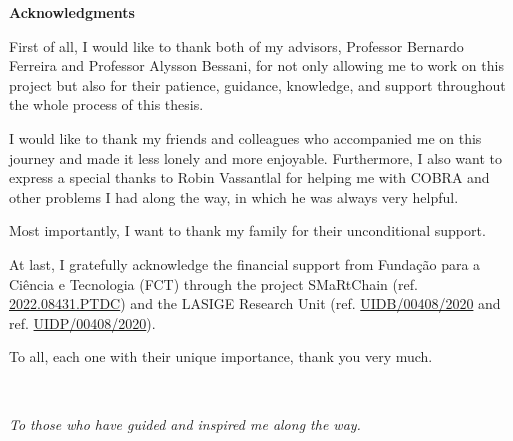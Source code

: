 \pagestyle{plain}

\vspace*{2cm}
\begin{center}
\Large \bf Acknowledgments
\end{center}
\vspace*{1cm} \setlength{\baselineskip}{0.6cm}

First of all, I would like to thank both of my advisors, Professor Bernardo Ferreira and Professor Alysson Bessani, for not only allowing me to work on this project but also for their patience, guidance, knowledge, and support throughout the whole process of this thesis.

I would like to thank my friends and colleagues who accompanied me on this journey and made it less lonely and more enjoyable. Furthermore, I also want to express a special thanks to Robin Vassantlal for helping me with COBRA and other problems I had along the way, in which he was always very helpful. 

Most importantly, I want to thank my family for their unconditional support.

At last, I gratefully acknowledge the financial support from Fundação para a Ciência e Tecnologia (FCT) through the project SMaRtChain (ref. \href{https://doi.org/10.54499/2022.08431.PTDC}{2022.08431.PTDC}) and the LASIGE Research Unit (ref. \href{https://doi.org/10.54499/UIDB/00408/2020}{UIDB/00408/2020} and ref. \href{https://doi.org/10.54499/UIDP/00408/2020}{UIDP/00408/2020}).

To all, each one with their unique importance, thank you very much.

\LIMPA
\LIMPA

~
\vfill

\begin{flushright}\textit{To those who have guided and inspired me along the way.}\end{flushright}

\LIMPA
